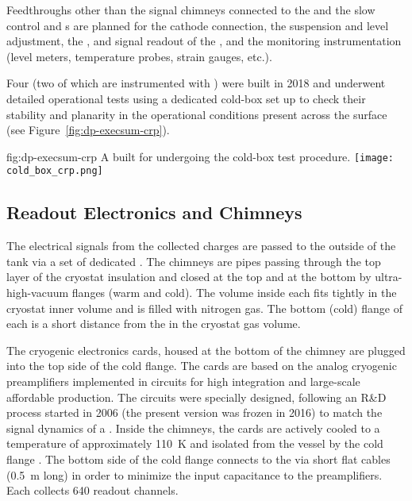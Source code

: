 Feedthroughs other than the signal chimneys connected to the  and the  slow control and \fdth{}s are planned for the cathode  connection, the  suspension and level adjustment, the , and signal readout of the , and the monitoring instrumentation (level meters, temperature probes, strain gauges, etc.).

Four  (two of which are instrumented with ) were built in 2018 and underwent detailed operational tests using a dedicated cold-box set up to check their  stability and planarity in the operational conditions present across the  surface (see Figure~\ref{fig:dp-execsum-crp}). 

\begin{dunefigure}{fig:dp-execsum-crp}
  {A   built for  undergoing the cold-box test procedure.}
  \texttt{[image: cold\_box\_crp.png]}
\end{dunefigure}



\subsection{Readout Electronics and Chimneys}
\label{sec:dp-execsum-electronics}

The electrical signals from the collected charges are passed to the outside of the tank via a set of dedicated . The chimneys are pipes passing through the top layer of the cryostat insulation and closed at the top and at the bottom by ultra-high-vacuum flanges (warm and cold). The volume inside each  fits tightly in the cryostat inner volume and is filled with nitrogen gas. The bottom (cold) flange of each  is a short distance  from the  in the cryostat gas volume.

The cryogenic  electronics cards, housed at the bottom of the chimney are plugged into the top side of  the cold flange. The  cards are based on the analog cryogenic preamplifiers implemented in   circuits for high integration and large-scale affordable production. 
The  circuits were specially designed, following an R\&D process started in 2006 (the present version was frozen in 2016) to match the signal dynamics of a . Inside the chimneys, the cards are actively cooled to a temperature of approximately \SI{110}{K} and isolated from the  vessel by the cold flange \fdth{}.  The bottom side of the cold flange connects to the  via short flat cables (\SI{0.5}{m} long) in order to minimize the input capacitance to the preamplifiers. Each  collects \num{640} readout channels. 

